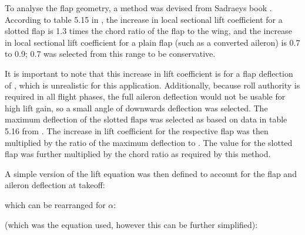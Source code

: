 \documentclass[../../main.tex]{subfiles}
\begin{document}
To analyse the flap geometry, a method was devised from Sadraeys book \cite{sadraey-13}.
According to table 5.15 in \cite{sadraey-13}, the increase in local sectional lift coefficient for a slotted flap is 1.3 times the chord ratio of the flap to the wing, and the increase in local sectional lift coefficient for a plain flap (such as a converted aileron) is 0.7 to 0.9; 0.7 was selected from this range to be conservative. 

It is important to note that this increase in lift coefficient is for a flap deflection of , which is unrealistic for this application.
Additionally, because roll authority is required in all flight phases, the full aileron deflection would not be usable for high lift gain, so a small angle of  downwards deflection was selected.
The maximum deflection of the slotted flaps was selected as  based on data in table 5.16 from \cite{sadraey-13}.
The increase in lift coefficient for the respective flap was then multiplied by the ratio of the maximum deflection to .
The value for the slotted flap was further multiplied by the chord ratio as required by this method. 

A simple version of the lift equation was then defined to account for the flap and aileron deflection at takeoff: 


which can be rearranged for $\alpha$:


(which was the equation used, however this can be further simplified):

\end{document}
